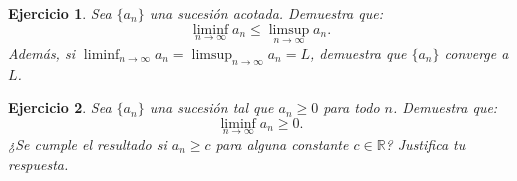 \documentclass[11pt]{report}
\newtheorem{ex}{Ejercicio}
\begin{document}
\begin{ex}
  Sea \( \{a_n\} \) una sucesión acotada. Demuestra que:
  \[
  \liminf_{n \to \infty} a_n \leq \limsup_{n \to \infty} a_n.
  \]
  Además, si \( \liminf_{n \to \infty} a_n = \limsup_{n \to \infty} a_n = L \), demuestra que \( \{a_n\} \) converge a \( L \).


\end{ex}

\begin{ex}
  Sea \( \{a_n\} \) una sucesión tal que \( a_n \geq 0 \) para todo \( n \). Demuestra que:
  \[
  \liminf_{n \to \infty} a_n \geq 0.
  \]
  ¿Se cumple el resultado si \( a_n \geq c \) para alguna constante \( c \in \mathbb{R} \)? Justifica tu respuesta.


\end{ex}
\end{document}
